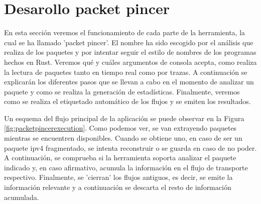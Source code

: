 \section{Desarollo packet pincer}

En esta sección veremos el funcionamiento de cada parte de la herramienta, la cual se ha llamado 'packet pincer'. El nombre ha sido escogido por el análisis que realiza de los paquetes y por intentar seguir el estilo de nombres de los programas hechos en Rust. Veremos qué y cuáles argumentos de consola acepta, como realiza la lectura de paquetes tanto en tiempo real como por trazas. A continuación se explicarán los diferentes pasos que se llevan a cabo en el momento de analizar un paquete y como se realiza la generación de estadísticas. Finalmente, veremos como se realiza el etiquetado automático de los flujos y se emiten los resultados.

Un esquema del flujo principal de la aplicación se puede observar en la Figura \ref{fig:packetpincerexecution}. Como podemos ver, se van extrayendo paquetes mientras se encuentren disponibles. Cuando se obtiene uno, en caso de ser un paquete \acrshort{ipv4} fragmentado, se intenta reconstruir o se guarda en caso de no poder. A continuación, se comprueba si la herramienta soporta analizar el paquete indicado y, en caso afirmativo, acumula la información en el flujo de transporte respectivo. Finalmente, se 'cierran' los flujos antiguos, es decir, se emite la información relevante y a continuación se descarta el resto de información acumulada.

